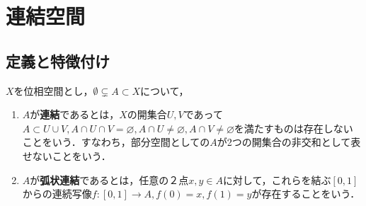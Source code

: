 \documentclass[uplatex,dvipdfmx]{jsreport}
\begin{document}
\section{連結空間}

\subsection{定義と特徴付け}

\begin{definition}[connected]\label{def-連結性}
    $X$を位相空間とし，$\emptyset\subsetneq A\subset X$について，
    \begin{enumerate}
        \item $A$が\textbf{連結}であるとは，$X$の開集合$U,V$であって$A\subset U\cup V,A\cap U\cap V=\varnothing, A\cap U\ne\varnothing, A\cap V\ne\varnothing$を満たすものは存在しないことをいう．すなわち，部分空間としての$A$が2つの開集合の非交和として表せないことをいう．
        \item $A$が\textbf{弧状連結}であるとは，任意の２点$x,y\in A$に対して，これらを結ぶ$[0,1]$からの連続写像$f:[0,1]\to A, f(0)=x, f(1)=y$が存在することをいう．
    \end{enumerate}
\end{definition}
\end{document}
